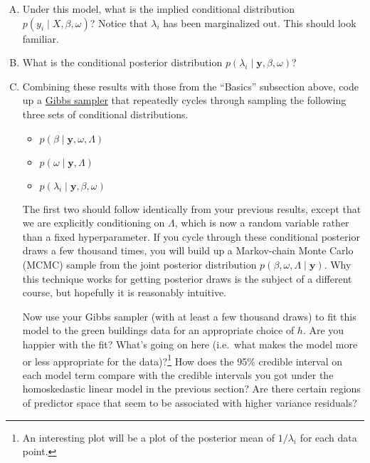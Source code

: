 \documentclass[11pt]{article}
\newcommand{\by}{\textbf{y}}
\begin{document}
\begin{enumerate}[(A)]


\item Under this model, what is the implied conditional distribution $p(y_i \mid X, \beta, \omega)$?  Notice that $\lambda_i$ has been marginalized out.  This should look familiar.

\item What is the conditional posterior distribution $p(\lambda_i \mid \by, \beta, \omega)$?

\item Combining these results with those from the ``Basics'' subsection above, code up a \href{http://en.wikipedia.org/wiki/Gibbs_sampling}{Gibbs sampler} that repeatedly cycles through sampling the following three sets of conditional distributions.
\begin{itemize}
\item $p(\beta \mid \by, \omega, \Lambda)$
\item $p(\omega \mid \by, \Lambda)$
\item $p(\lambda_i \mid \by, \beta, \omega)$
\end{itemize}
The first two should follow identically from your previous results, except that we are explicitly conditioning on $\Lambda$, which is now a random variable rather than a fixed hyperparameter.  If you cycle through these conditional posterior draws a few thousand times, you will build up a Markov-chain Monte Carlo (MCMC) sample from the joint posterior distribution $p(\beta, \omega, \Lambda \mid \by)$.  Why this technique works for getting posterior draws is the subject of a different course, but hopefully it is reasonably intuitive.

Now use your Gibbs sampler (with at least a few thousand draws) to fit this model to the green buildings data for an appropriate choice of $h$.  Are you happier with the fit?  What's going on here (i.e.~what makes the model more or less appropriate for the data)?\footnote{An interesting plot will be a plot of the posterior mean of $1/\lambda_i$ for each data point.}  How does the 95\% credible interval on each model term compare with the credible intervals you got under the homoskedastic linear model in the previous section?  Are there certain regions of predictor space that seem to be associated with higher variance residuals?  

\end{enumerate}
\end{document}
